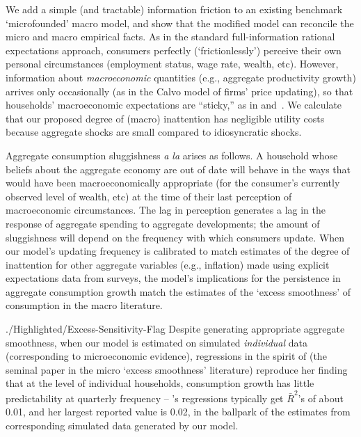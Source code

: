 We add a simple (and tractable) information friction to an existing benchmark `microfounded' macro model, and show that the modified model can reconcile the micro and macro empirical facts. As in the standard full-information rational expectations approach, consumers perfectly (`frictionlessly') perceive their own personal circumstances (employment status, wage rate, wealth, etc). However, information about \textit{macroeconomic} quantities (e.g., aggregate productivity growth) arrives only occasionally (as in the Calvo model of firms' price updating), so that households' macroeconomic expectations are ``sticky,'' as in \cite{mrSlumps} and~\cite{carroll:epidemicinflQJE}. We calculate that our proposed degree of (macro) inattention has negligible utility costs because aggregate shocks are small compared to idiosyncratic shocks.

Aggregate consumption sluggishness \textit{a la} \cite{cdSmooth} arises as follows.  A household whose beliefs about the aggregate economy are out of date will behave in the ways that would have been macroeconomically appropriate (for the consumer's currently observed level of wealth, etc) at the time of their last perception of macroeconomic circumstances.  The lag in perception generates a lag in the response of aggregate spending to aggregate developments; the amount of sluggishness will depend on the frequency with which consumers update.  When our model's updating frequency is calibrated to match estimates of the degree of inattention for other aggregate variables (e.g., inflation) made using explicit expectations data from surveys, the model's implications for the persistence in aggregate consumption growth match the estimates of the `excess smoothness' of consumption in the macro literature. %

\hypertarget{dynanR2}{}
\hypertarget{Excess-Sensitivity-Flag}{} %

\begin{verbatimwrite}{./Highlighted/Excess-Sensitivity-Flag}
  Despite generating appropriate aggregate smoothness, when our model is estimated on simulated \emph{individual} data (corresponding to microeconomic evidence), regressions in the spirit of  \cite{dynanHabits} (the seminal paper in the micro `excess smoothness' literature) reproduce her finding that at the level of individual households, consumption growth has little predictability at quarterly frequency -- \cite{dynanHabits}'s regressions typically get $\bar{R}^{2}$'s %
  of about 0.01, and her largest reported value is 0.02, in the ballpark of the estimates from corresponding simulated data generated by our model.
\end{verbatimwrite}


